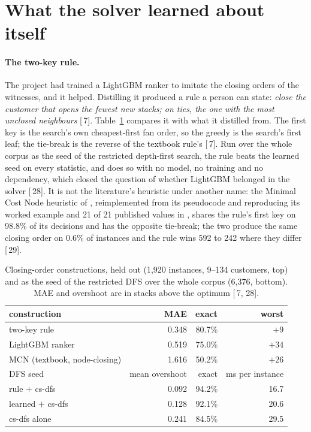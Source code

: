 \documentclass[11pt,a4paper]{article}
\renewcommand{\S}[1]{[\textsection\,#1]}
\begin{document}
\section{What the solver learned about itself}
\label{sec:solver}

\paragraph{The two-key rule.}
The project had trained a LightGBM ranker to imitate the closing orders of the
witnesses, and it helped. Distilling it produced a rule a person can state:
\emph{close the customer that opens the fewest new stacks; on ties, the one
with the most unclosed neighbours} \S{7}. Table~\ref{tab:rule} compares it
with what it distilled from. The first key is the search's own cheapest-first
fan order, so the greedy is the search's first leaf; the tie-break is the
reverse of the textbook rule's \S{7}. Run over the whole corpus as the seed of
the restricted depth-first search, the rule beats the learned seed on every
statistic, and does so with no model, no training and no dependency, which
closed the question of whether LightGBM belonged in the solver \S{28}. It is
not the literature's heuristic under another name: the Minimal Cost Node
heuristic of \citet{BYS2004}, reimplemented from its pseudocode and
reproducing its worked example and 21 of 21 published values in
\citet{Frinhani2018}, shares the rule's first key on 98.8\% of its decisions
and has the opposite tie-break; the two produce the same closing order on
0.6\% of instances and the rule wins 592 to 242 where they differ \S{29}.

\begin{table}[t]
\centering
\small
\caption{Closing-order constructions, held out (1,920 instances, 9--134
customers, top) and as the seed of the restricted DFS over the whole corpus
(6,376, bottom). MAE and overshoot are in stacks above the optimum
\S{7, 28}.}
\label{tab:rule}
\begin{tabular}{lrrr}
\toprule
construction & MAE & exact & worst \\
\midrule
two-key rule & 0.348 & 80.7\% & $+9$ \\
LightGBM ranker & 0.519 & 75.0\% & $+34$ \\
MCN (textbook, node-closing) & 1.616 & 50.2\% & $+26$ \\
\midrule
DFS seed & mean overshoot & exact & ms per instance \\
\midrule
rule $+$ cs-dfs & 0.092 & 94.2\% & 16.7 \\
learned $+$ cs-dfs & 0.128 & 92.1\% & 20.6 \\
cs-dfs alone & 0.241 & 84.5\% & 29.5 \\
\bottomrule
\end{tabular}
\end{table}
\end{document}
